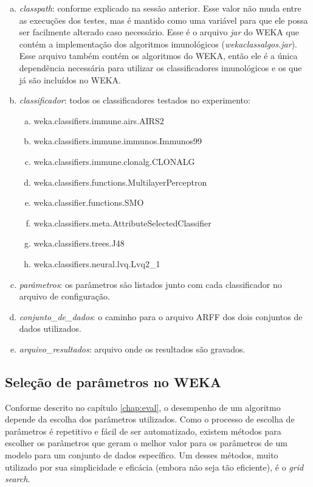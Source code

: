 \begin{enumerate}[a)]
    \item \emph{classpath}: conforme explicado na sessão anterior. Esse valor não muda entre as execuções dos testes, mas é mantido como uma variável para que ele possa ser facilmente alterado caso necessário. Esse é o arquivo \emph{jar} do WEKA que contém a implementação dos algoritmos imunológicos (\emph{wekaclassalgos.jar}). Esse arquivo também contém os algoritmos do WEKA, então ele é a única dependência necessária para utilizar os classificadores imunológicos e os que já são incluídos no WEKA.
    \item \emph{classificador}: todos os classificadores testados no experimento:
        \begin{enumerate}[a)]
            \item weka.classifiers.immune.airs.AIRS2
            \item weka.classifiers.immune.immunos.Immunos99
            \item weka.classifiers.immune.clonalg.CLONALG
            \item weka.classifiers.functions.MultilayerPerceptron
            \item weka.classifier.functions.SMO
            \item weka.classifiers.meta.AttributeSelectedClassifier
            \item weka.classifiers.trees.J48
            \item weka.classifiers.neural.lvq.Lvq2\_1
        \end{enumerate}
    \item \emph{parâmetros}: os parâmetros são listados junto com cada classificador no arquivo de configuração.
    \item \emph{conjunto\_de\_dados}: o caminho para o arquivo ARFF dos dois conjuntos de dados utilizados.
    \item \emph{arquivo\_resultados}: arquivo onde os resultados são gravados.
\end{enumerate}

\subsection{Seleção de parâmetros no WEKA}

Conforme descrito no capítulo \ref{chap:eval}, o desempenho de um algoritmo depende da escolha dos parâmetros utilizados. Como o processo de escolha de parâmetros é repetitivo e fácil de ser automatizado, existem métodos para escolher os parâmetros que geram o melhor valor para os parâmetros de um modelo para um conjunto de dados específico. Um desses métodos, muito utilizado por sua simplicidade e eficácia (embora não seja tão eficiente), é o \emph{grid search}.

